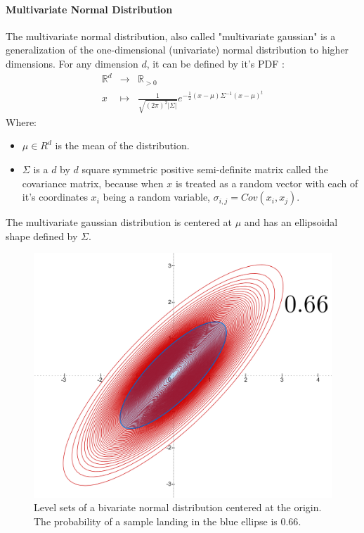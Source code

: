 \documentclass[a4paper,12pt]{article}
\theoremstyle{definition}
\theoremstyle{plain}
\def\R{\mathbb{R}}%
\newcommand\fonctionnonnommee[4]{\begin{array}{ccc}
		#1 &\longrightarrow& #2\\
		#3 &\longmapsto & #4
\end{array}}%
\begin{document}
\paragraph{Multivariate Normal Distribution} The multivariate normal distribution, also called "multivariate gaussian" is a generalization of the one-dimensional (univariate) normal distribution to higher dimensions. For any dimension $d$, it can be defined by it's PDF :
$$\fonctionnonnommee{\R^{d}}{\R_{>0}}{x}{\frac{1}{\sqrt{(2\pi)^2 \lvert \Sigma \rvert}} e^{-\frac{1}{2}(x-\mu) \Sigma^{-1} (x-\mu)^{t}}}$$
Where:
\begin{itemize}
	\item $\mu \in{R^d}$ is the mean of the distribution.
	\item $\Sigma$ is a $d$ by $d$ square symmetric positive semi-definite matrix called the covariance matrix, because when $x$ is treated as a random vector with each of it's coordinates $x_i$ being a random variable, $\sigma_{i,j}= Cov(x_{i},x_{j})$.
\end{itemize}
The multivariate gaussian distribution is centered at $\mu$ and has an ellipsoidal shape defined by $\Sigma$.
\begin{figure}[H]
	\centering
	\includegraphics[width=0.4\linewidth]{figures/Binorm}
	\caption{Level sets of a bivariate normal distribution centered at the origin. The probability of a sample landing in the blue ellipse is $0.66$.}
	\label{fig:binorm}
\end{figure}
\end{document}
